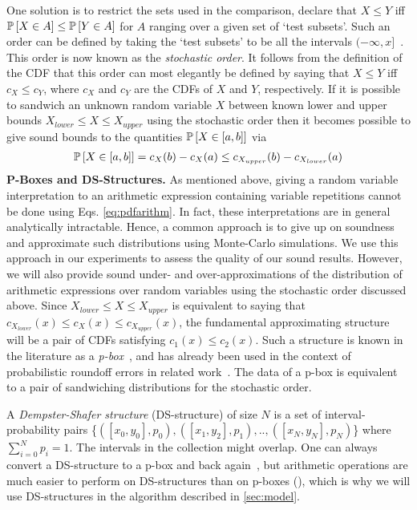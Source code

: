 One solution is to restrict the sets used in the comparison,  \ie declare that $X\leq Y$ iff $\mathbb{P}\left[ X\in A \right]\leq \mathbb{P}\left[ Y\in A \right]$ for $A$ ranging over a given set of `test subsets'.  Such an order can be defined by taking the `test subsets' to be all the intervals $(-\infty, x]$~\cite{rothschild1970increasing}. This order is now known as the \emph{stochastic order}. 
It follows from the definition of the CDF that this order can most elegantly be defined by saying that $X\leq Y$ iff $c_X\leq c_Y$, where $c_X$ and $c_Y$ are the CDFs of $X$ and $Y$, respectively.  If it is possible to sandwich an unknown random variable $X$ between known lower and upper bounds $X_{lower}\leq X\leq X_{upper}$ using the stochastic order then it becomes possible to give sound bounds to the quantities $\mathbb{P}\left[ X\in[a,b] \right]$ via
\begin{align*}
\mathbb{P}\left[ X\in[a,b] \right] = c_X(b) - c_X(a)\leq c_{X_{upper}}(b) - c_{X_{lower}}(a)
\end{align*}
\noindent\textbf{P-Boxes and DS-Structures.} As mentioned above, giving a random variable interpretation to an arithmetic expression containing variable repetitions cannot be done using Eqs. \eqref{eq:pdfarithm}. In fact, these interpretations are in general analytically intractable. Hence, a common approach is to give up on soundness and approximate such distributions using Monte-Carlo simulations.  We use this approach in our experiments to assess the quality of our sound results.
However,  we will also provide sound under- and over-approximations of the distribution of arithmetic expressions over random variables using the stochastic order discussed above.  Since $X_{lower}\leq X\leq X_{upper}$ is equivalent to saying that $c_{X_{lower}}(x)\leq c_X(x)\leq c_{X_{upper}}(x)$, the fundamental approximating structure will be a pair of CDFs satisfying $c_1(x)\leq c_2(x)$.  Such a structure is known in the literature as a \emph{p-box}~\cite{ferson2015constructing}, and has already been used in the context of probabilistic roundoff errors in related work~\cite{bouissou2012generalization,probdaisy}.  
The data of a p-box is equivalent to a pair of sandwiching distributions for the stochastic order.

A \emph{Dempster-Shafer structure} (DS-structure) of size $N$ is a set of interval-probability pairs \{$([x_{0}, y_{0}], p_{0}), ([x_{1}, y_{2}], p_{1}),.., ([x_{N}, y_{N}], p_{N})$\} where $\sum_{i=0}^{N}p_{i}=1$.  The intervals in the collection might overlap. One can always convert a DS-structure to a p-box and back again~\cite{ferson2015constructing},  but arithmetic operations are much easier to perform on DS-structures than on p-boxes (\cite{bouissou2012generalization}),
which is why we will use DS-structures in the algorithm described in \cref{sec:model}.

